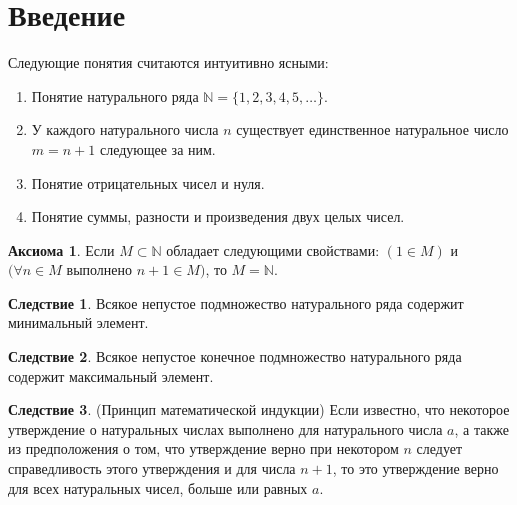 \documentclass[a4paper, 12pt]{article}
\theoremstyle{definition}
\newtheorem{cons}{Следствие}
\newtheorem*{axiom}{Аксиома}
\begin{document}
    \section*{Введение}
        Следующие понятия считаются интуитивно ясными:
    \begin{enumerate}
        \item Понятие натурального ряда $\mathbb{N} = \{1, 2, 3, 4, 5, \dots\}$.
        \item У каждого натурального числа $n$ существует единственное натуральное число $m=n+1$ следующее за ним. 
        \item Понятие отрицательных чисел и нуля.
        \item Понятие суммы, разности и произведения двух целых чисел.
    \end{enumerate}
    \begin{axiom}
        Если $M \subset \mathbb{N}$ обладает следующими свойствами: $(1 \in M)$ и $(\forall n\in M$ выполнено $n+1 \in M)$, то $M = \mathbb{N}$.
    \end{axiom}
    \begin{cons}
        Всякое непустое подмножество натурального ряда содержит минимальный элемент.
    \end{cons}
    \begin{cons}
        Всякое непустое конечное подмножество натурального ряда содержит максимальный элемент.
    \end{cons}
    \begin{cons} (Принцип математической индукции)\newline
        Если известно, что некоторое утверждение о натуральных числах выполнено для натурального числа $a$, а также из предположения о том, что утверждение верно при некотором $n$ следует справедливость этого утверждения и для числа $n+1$, то это утверждение верно для всех натуральных чисел, больше или равных $a$.
    \end{cons}
\end{document}
